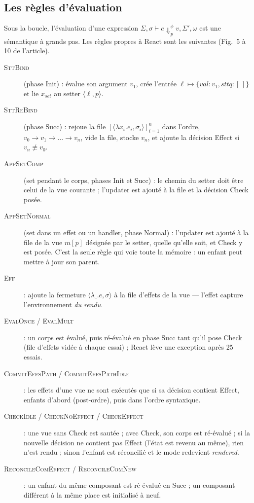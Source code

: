 \subsection{Les règles d'évaluation}

Sous la boucle, l'évaluation d'une expression
$\Sigma, \sigma \vdash e \Downarrow^{\phi}_{p} v, \Sigma', \omega$ est une
sémantique à grands pas. Les règles propres à React sont les suivantes
(Fig.~5 à 10 de l'article).
\begin{description}
  \item[\textsc{SttBind}] (phase \textsf{Init}) :  évalue son
    argument $v_1$, crée l'entrée $\ell \mapsto \{\mathit{val}: v_1,
    \mathit{sttq}: [\,]\}$ et lie $x_{\mathit{set}}$ au setter
    $\langle \ell, p\rangle$.
  \item[\textsc{SttReBind}] (phase \textsf{Succ}) :  rejoue la
    file $[\langle \lambda x_i.e_i, \sigma_i\rangle]_{i=1}^{n}$ dans l'ordre,
    $v_0 \to v_1 \to \dots \to v_n$, vide la file, stocke $v_n$, et ajoute la
    décision \textsf{Effect} si $v_n \not\equiv v_0$.
  \item[\textsc{AppSetComp}] (set pendant le corps, phases \textsf{Init} et
    \textsf{Succ}) : le chemin du setter doit être celui de la vue courante ;
    l'updater est ajouté à la file et la décision \textsf{Check} posée.
  \item[\textsc{AppSetNormal}] (set dans un effet ou un handler, phase
    \textsf{Normal}) : l'updater est ajouté à la file de la vue $m[p]$ désignée
    par le setter, quelle qu'elle soit, et \textsf{Check} y est posée. C'est la
    seule règle qui voie toute la mémoire : un enfant peut mettre à jour son
    parent.
  \item[\textsc{Eff}] :  ajoute la fermeture
    $\langle \lambda\_.e, \sigma\rangle$ à la file d'effets de la vue ---
    l'effet capture l'environnement \emph{du rendu}.
  \item[\textsc{EvalOnce} / \textsc{EvalMult}] : un corps est évalué, puis
    ré-évalué en phase \textsf{Succ} tant qu'il pose \textsf{Check} (file
    d'effets vidée à chaque essai) ; React lève une exception après 25
    essais.
  \item[\textsc{CommitEffsPath} / \textsc{CommitEffsPathIdle}] : les effets
    d'une vue ne sont exécutés que si sa décision contient \textsf{Effect},
    enfants d'abord (post-ordre), puis dans l'ordre syntaxique.
  \item[\textsc{CheckIdle} / \textsc{CheckNoEffect} / \textsc{CheckEffect}] :
    une vue sans \textsf{Check} est sautée ; avec \textsf{Check}, son corps
    est ré-évalué ; si la nouvelle décision ne contient pas \textsf{Effect}
    (l'état est revenu au même), rien n'est rendu ; sinon l'enfant est
    réconcilié et le mode redevient \emph{rendered}.
  \item[\textsc{ReconcileComEffect} / \textsc{ReconcileComNew}] : un enfant
    du même composant est ré-évalué en \textsf{Succ} ; un composant différent
    à la même place est initialisé à neuf.
\end{description}


